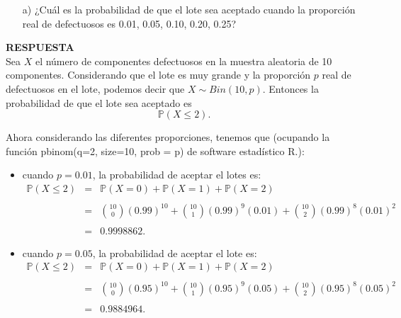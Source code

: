 \documentclass[11pt,letterpaper]{article}
\newcommand{\mP}{\mathbb{P}}
\newcommand{\res}{\textbf{RESPUESTA}\\}
\begin{document}
\begin{itemize}
\begin{itemize}
\item[a)] ¿Cuál es la probabilidad de que el lote sea aceptado cuando la proporción real de defectuosos es 0.01, 0.05, 0.10, 0.20, 0.25?
\end{itemize}

\res

Sea $X$ el número de componentes defectuosos en la muestra aleatoria de 10 componentes. Considerando que el lote es muy grande y la proporción $p$ real de defectuosos en el lote, podemos decir que $X\sim Bin(10,p)$. Entonces la probabilidad de que el lote sea aceptado es $$\mP(X\leq 2).$$

Ahora considerando las diferentes proporciones, tenemos que (ocupando la función \textsf{pbinom(q=2, size=10, prob = p)} de software estadístico R.):

\begin{itemize}
\item cuando $p=0.01$, la probabilidad de aceptar el lotes es:
\begin{equation*}
\begin{array}{ccl}
\mP(X\leq 2)&=&\mP(X=0)+\mP(X=1)+\mP(X=2)\\
&& \\
&=&{10\choose0}(0.99)^{10}+{10\choose1}(0.99)^9(0.01)+{10\choose2}(0.99)^8(0.01)^2\\
&&\\
&=&0.9998862.
\end{array}
\end{equation*}

\item cuando $p=0.05$, la probabilidad de aceptar el lote es: 
\begin{equation*}
\begin{array}{ccl}
\mP(X\leq 2)&=&\mP(X=0)+\mP(X=1)+\mP(X=2)\\
&& \\
&=&{10\choose0}(0.95)^{10}+{10\choose1}(0.95)^9(0.05)+{10\choose2}(0.95)^8(0.05)^2\\
&& \\
&=& 0.9884964.
\end{array}
\end{equation*}


\end{itemize}
\end{itemize}
\end{document}
